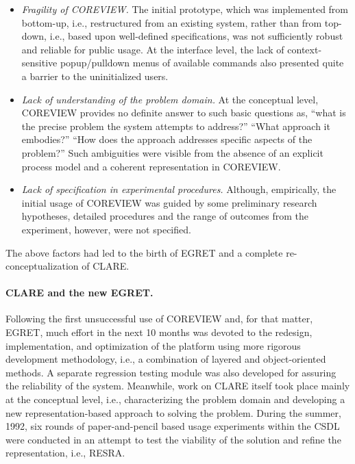 \begin{itemize}
\item {\it Fragility of COREVIEW.} The initial prototype, which was
  implemented from bottom-up, i.e., restructured from an existing system,
  rather than from top-down, i.e., based upon well-defined specifications,
  was not sufficiently robust and reliable for public usage. At the
  interface level, the lack of context-sensitive popup/pulldown menus of
  available commands also presented quite a barrier to the uninitialized
  users.
  
\item {\it Lack of understanding of the problem domain.\/} At the
  conceptual level, COREVIEW provides no definite answer to such basic
  questions as, ``what is the precise problem the system attempts to
  address?'' ``What approach it embodies?'' ``How does the approach
  addresses specific aspects of the problem?'' Such ambiguities were
  visible from the absence of an explicit process model and a coherent
  representation in COREVIEW.
  
\item {\it Lack of specification in experimental procedures.\/} Although,
  empirically, the initial usage of COREVIEW was guided by some preliminary
  research hypotheses, detailed procedures and the range of outcomes from
  the experiment, however, were not specified.
\end{itemize}

The above factors had led to the birth of EGRET and a complete
re-conceptualization of CLARE.


\paragraph{CLARE and the new EGRET.}

Following the first unsuccessful use of COREVIEW and, for that matter,
EGRET, much effort in the next 10 months was devoted to the redesign,
implementation, and optimization of the platform using more rigorous
development methodology, i.e., a combination of layered and object-oriented
methods. A separate regression testing module was also developed for
assuring the reliability of the system.  Meanwhile, work on CLARE itself
took place mainly at the conceptual level, i.e., characterizing the problem
domain and developing a new representation-based approach to solving the
problem. During the summer, 1992, six rounds of paper-and-pencil based
usage experiments within the CSDL were conducted in an attempt to test the
viability of the solution and refine the representation, i.e., RESRA.

